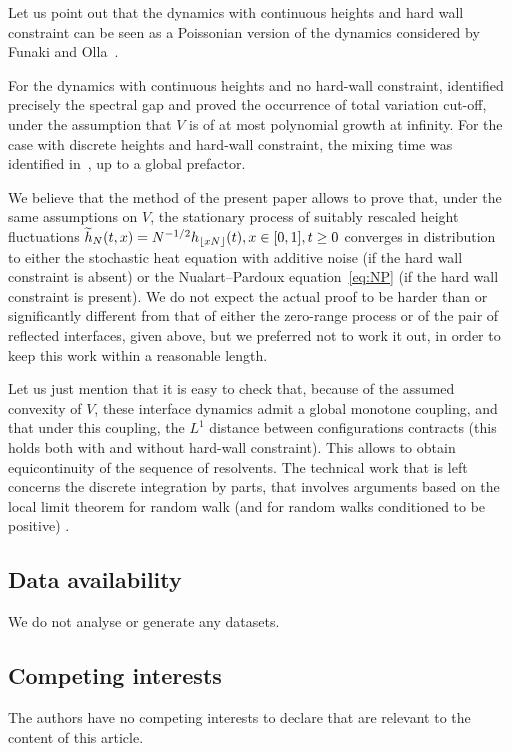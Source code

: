 \documentclass[AHL,Unicode,longabstracts]{cedram}
\theoremstyle{plain}
\let\oldtilde\tilde
\renewcommand*{\tilde}[1]{\mathchoice{\widetilde{#1}}{\widetilde{#1}}{\oldtilde{#1}}{\oldtilde{#1}}}
\begin{document}
Let us point out that the dynamics with continuous heights and hard wall constraint can be seen as a Poissonian version of the dynamics considered by Funaki and Olla~\cite{FunaOlla}.

For the dynamics with continuous heights and no hard-wall constraint, \cite{caputo2022spectral} identified precisely the spectral gap and proved the occurrence of total variation cut-off, under the assumption that $V$ is of at most polynomial growth at infinity. For the case with discrete heights and hard-wall constraint, the mixing time was identified in~\cite[Section~3]{martinelli2009mixing}, up to a global prefactor.

We believe that the method of the present paper allows to prove that, under the same assumptions on $V$, the stationary process of suitably rescaled height fluctuations $\tilde h_N(t,x)=N^{-1/2}h_{\lfloor x N\rfloor}(t), x\in[0,1],t\ge0$ converges in distribution to either the stochastic heat equation with additive noise (if the hard wall constraint is absent) or the Nualart--Pardoux equation~\eqref{eq:NP} (if the hard wall constraint is present). We do not expect the actual proof to be harder than or significantly different from that of either the zero-range process or of the pair of reflected interfaces, given above, but we preferred not to work it out, in order to keep this work within a reasonable length.

Let us just mention that it is easy to check that, because of the assumed convexity of $V$, these interface dynamics admit a global monotone coupling, and that under this coupling, the $L^1$ distance between configurations contracts (this holds both with and without hard-wall constraint). This allows to obtain equicontinuity of the sequence of resolvents. The technical work that is left concerns the discrete integration by parts, that involves arguments based on the local limit theorem for random walk (and for random walks conditioned to be positive) \cite{bryn2006functional,caravenna2008invariance}.

\subsection*{Data availability}
We do not analyse or generate any datasets.

\subsection*{Competing interests}
The authors have no competing interests to declare that are relevant to the content of this article.

\let\OLDthebibliography\thebibliography
\renewcommand\thebibliography[1]{
\OLDthebibliography{#1}
\setlength{\parskip}{0pt}
\setlength{\itemsep}{5pt plus 0.25ex}}


\end{document}
